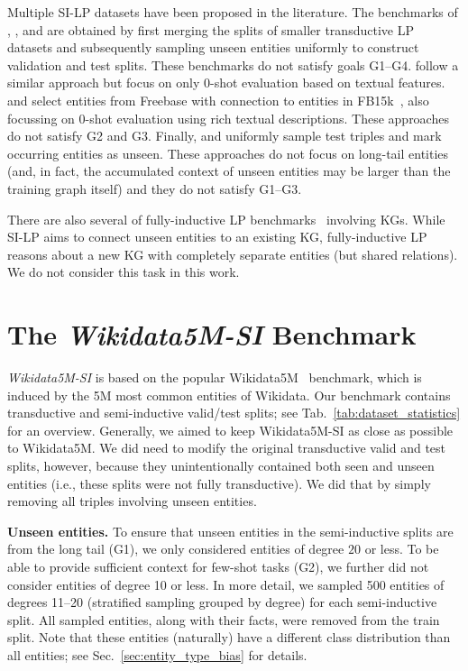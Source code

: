 \documentclass[11pt]{article}
\renewcommand\:{\colon} \newcommand{\sset}[1]{\left\{\,#1\,\right\}} \newcommand{\ssets}[1]{\left\{#1\right\}} \newcommand{\ssetn}[1]{\{\,#1\,\}}
\begin{document}
Multiple SI-LP datasets have been proposed in the literature. The benchmarks of
\citet{daza2021inductive}, \citet{albooyeh2020out}, and
\citet{galkin2021nodepiece} are obtained by first merging the splits of smaller
transductive LP datasets and subsequently sampling unseen entities uniformly to
construct validation and test splits. These benchmarks do not satisfy goals
G1--G4. \citet{shi2018open} follow a similar approach but focus on only
0-shot evaluation based on textual features. \citet{xie2016representation} and
\citet{shah2019open} select entities from Freebase with connection to entities
in FB15k~\cite{bordes2013translating}, also focussing on 0-shot evaluation using
rich textual descriptions. These approaches do not satisfy G2 and G3. Finally,
\citet{wang2019logic} and \citet{hamaguchi2017knowledge} uniformly sample test
triples and mark occurring entities as unseen. These approaches do not focus on
long-tail entities (and, in fact, the accumulated context of unseen entities may
be larger than the training graph itself) and they do not satisfy G1--G3.



There are also several of fully-inductive LP
benchmarks~\cite{teru2020inductive,wang2021KEPLER} involving KGs. While SI-LP
aims to connect unseen entities to an existing KG, fully-inductive LP reasons
about a new KG with completely separate entities (but shared relations). We do
not consider this task in this work.

\section{The \emph{Wikidata5M-SI} Benchmark}
\label{sec:dataset}



\emph{Wikidata5M-SI} is based on the popular Wikidata5M~\cite{wang2021KEPLER}
benchmark, which is induced by the 5M most common entities of Wikidata. Our
benchmark contains trans\-duc\-tive and semi-inductive valid/test splits; see
Tab.~\ref{tab:dataset_statistics} for an overview. Generally, we aimed to keep
Wikidata5M-SI as close as possible to Wikidata5M. We did need to modify the
original transductive valid and test splits, however, because they
unintentionally contained both seen and unseen entities (i.e., these splits were
not fully transductive). We did that by simply removing all triples involving
unseen entities.

\textbf{Unseen entities.} To ensure that unseen entities in the semi-inductive
splits are from the long tail (G1), we only considered entities of degree $20$
or less. To be able to provide sufficient context for few-shot tasks (G2), we
further did not consider entities of degree 10 or less. In more detail, we
sampled 500 entities of degrees 11--20 (stratified sampling grouped by degree)
for each semi-inductive split. All sampled entities, along with their facts, were
removed from the train split. Note that these entities (naturally) have a
different class distribution than all entities; see
Sec.~\ref{sec:entity_type_bias} for details.
\end{document}

